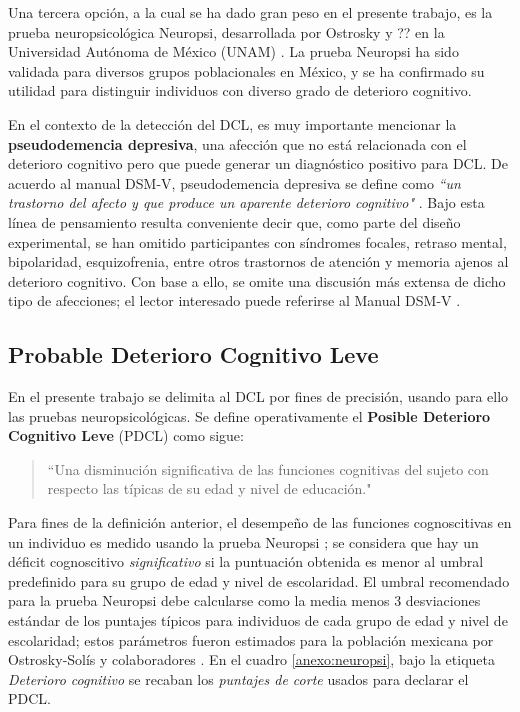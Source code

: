 
Una tercera opción, a la cual se ha dado gran peso en el presente trabajo, es la prueba neuropsicológica Neuropsi, desarrollada por Ostrosky y ?? en la Universidad Autónoma de México (UNAM) \cite{Ostrosky1999}.
%
La prueba Neuropsi ha sido validada para diversos grupos poblacionales en México, y se ha confirmado su utilidad para distinguir individuos con diverso grado de deterioro cognitivo.

En el contexto de la detección del DCL, es muy importante mencionar la \textbf{pseudodemencia depresiva}, una afección que no está relacionada con el deterioro cognitivo pero que puede generar un diagnóstico positivo para DCL.
%
De acuerdo al manual DSM-V, pseudodemencia depresiva se define como \textit{``un trastorno del afecto y que produce un aparente deterioro cognitivo"} \cite{DCM5}.
%
Bajo esta línea de pensamiento resulta conveniente decir que, como parte del diseño experimental, se han omitido participantes con síndromes focales, retraso mental, bipolaridad, esquizofrenia, entre otros trastornos de atención y memoria ajenos al deterioro cognitivo. 
%
Con base a ello, se omite una discusión más extensa de dicho tipo de afecciones; el lector interesado puede referirse al Manual DSM-V \cite{DCM5}.

\subsection{Probable Deterioro Cognitivo Leve}

En el presente trabajo se delimita al DCL por fines de precisión, usando para ello las pruebas neuropsicológicas. 
%
Se define operativamente el \textbf{Posible Deterioro Cognitivo Leve} (PDCL) como sigue:
\begin{quote}
``Una disminución significativa de las funciones cognitivas del sujeto con respecto las típicas de su edad y nivel de educación."
\end{quote}

Para fines de la definición anterior, el desempeño de las funciones cognoscitivas en un individuo es medido usando la prueba Neuropsi \cite{Ostrosky1999}; se considera que hay un déficit cognoscitivo \textit{significativo} si la puntuación obtenida es menor al umbral predefinido para su grupo de edad y nivel de escolaridad.
%
El umbral recomendado para la prueba Neuropsi debe calcularse como la media menos 3 desviaciones estándar de los puntajes típicos para individuos de cada grupo de edad y nivel de escolaridad; estos parámetros fueron estimados para la población mexicana por Ostrosky-Solís y colaboradores \cite{Ostrosky1999}.
%
En el cuadro \ref{anexo:neuropsi}, bajo la etiqueta \textit{Deterioro cognitivo} se recaban los \textit{puntajes de corte} usados para declarar el PDCL.

